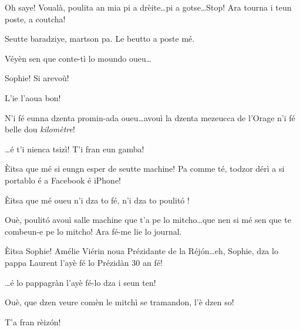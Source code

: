 \begin{drama}

\Maganspeaks Oh saye! Voualà, poulita an mia pi a drèite\ldots pi a gotse\ldots Stop! Ara tourna i teun poste, a coutcha!


\Maganspeaks Seutte baradziye, martson pa. Le beutto a poste mé.


\Maganspeaks{} Véyèn sen que conte-tì lo moundo oueu\ldots


\Paganspeaks Sophie! Si arevoù!

\Maganspeaks L'ie l’aoua bon!

\Paganspeaks {} N'i fé eunna dzenta promin-ada oueu\ldots avouì la dzenta mezeucca de l’Orage n'i fé belle dou \textit{kilomètre}!

\Maganspeaks \ldots é t'i nienca tsizì! T'i fran eun gamba!


\Paganspeaks \`Eitsa que mé si eungn esper de seutte machine! Pa comme té, todzor dérì a si portablo é a Facebook é iPhone!

\Maganspeaks \`Eitsa que mé oueu n'i dza to fé, n'i dza to poulit\'o !


\Paganspeaks Ouè, poulit\'o avouì salle machine que t'a pe lo mitcho\ldots que nen si mé sen que te combeun-e pe lo mitcho!  Ara fé-me lie lo journal.

\Paganspeaks \`Eitsa Sophie! Amélie Viérin noua Prézidante de la Réj\'on\ldots eh, Sophie, dza lo pappa Laurent l'ayè fé lo Prézidàn 30 an fé!

\Maganspeaks \ldots é lo pappagràn l'ayè fé-lo dza i seun ten!

\Paganspeaks Ouè, que dzen veure comèn le mitchì se tramandon, l'è dzen so!

\Maganspeaks T'a fran rèiz\'on!



\end{drama}
